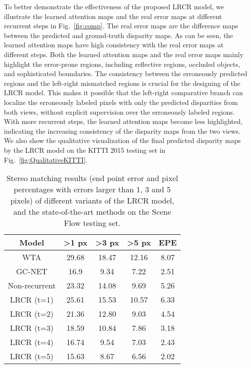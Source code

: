 \documentclass[10pt,twocolumn,letterpaper]{article}
\begin{document}
 To better demonstrate the effectiveness of the proposed LRCR model, we illustrate the learned attention maps and the real error maps at different recurrent steps in Fig.~\ref{fig:comp}. The real error maps are the difference maps between the predicted and  ground-truth disparity maps. As can be seen, the learned attention maps have high consistency with the real error maps at different steps.  Both the learned attention maps and the real error maps mainly highlight the error-prone regions, including reflective regions, occluded objects, and sophisticated boundaries. The consistency between the erroneously predicted regions and the left-right mismatched regions  is crucial for the designing of the LRCR model. This makes  it possible that the left-right comparative branch can  localize the erroneously labeled pixels with only the predicted disparities from  both views, without  explicit supervision over the erroneously labeled regions.  With more recurrent steps, the learned attention maps become less highlighted, indicating the increasing consistency of the disparity maps from the two views. We also show the qualitative visualization of the final  predicted disparity maps by the LRCR model on the KITTI 2015 testing set in Fig.~\ref{fig:QualitativeKITTI}.
 \begin{table}
 	\small
 	\setlength{\tabcolsep}{2.5pt}
 	\renewcommand{\arraystretch}{1.1}
 	\centering
 	\caption{\small Stereo matching results (end point error and pixel percentages with errors larger than 1, 3 and 5 pixels) of different variants of the LRCR model, and the state-of-the-art methods on the Scene Flow  testing set.}
 	\vspace{-0.2cm}
 	\begin{tabular}{c||c|c|c|c}
 		
 		Model & \textgreater 1 px& \textgreater 3 px & \textgreater 5 px & EPE  \\
 		\hline
 		WTA & 29.68 & 18.47 & 12.16& 8.07  \\
 		\hline
 		GC-NET \cite{kendall2017end} &16.9 &9.34 &7.22 & 2.51 \\ 
 		\hline
 		Non-recurrent  & 23.32 & 14.08 & 9.69 & 5.26    \\ 
 		\hline
 		LRCR (t=1)    & 25.61 & 15.53 & 10.57 & 6.33   \\
 		LRCR (t=2)    & 21.36 & 12.80 & 9.03 & 4.54   \\
 		LRCR (t=3)    & 18.59 & 10.84 & 7.86 & 3.18   \\
 		LRCR (t=4)    & 16.74 & 9.54  & 7.03  & 2.43   \\
 		LRCR (t=5)    & 15.63 & 8.67  & 6.56  & 2.02   \\
 		\hline
 	\end{tabular}
 	\label{tab:SF}%
 	\vspace{-0.2cm}
 \end{table}
 
\end{document}
